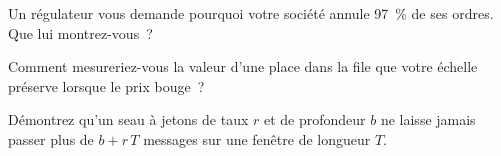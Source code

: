 \begin{interviewq}\label{iq:hf:the-quoting-engine:4}
Un régulateur vous demande pourquoi votre société annule 97~\% de ses ordres. Que lui montrez-vous~?
\end{interviewq}

\begin{interviewq}\label{iq:hf:the-quoting-engine:5}
Comment mesureriez-vous la valeur d'une place dans la file que votre échelle préserve lorsque le prix bouge~?
\end{interviewq}

\begin{interviewq}\label{iq:hf:the-quoting-engine:6}
Démontrez qu'un seau à jetons de taux $r$ et de profondeur $b$ ne laisse jamais passer plus de $b+r\,T$ messages sur une fenêtre de longueur $T$.
\end{interviewq}
